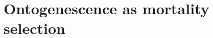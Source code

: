 \documentclass[12pt, parskip=half]{scrartcl}
\begin{document}

\section{Ontogenescence as mortality selection}

\end{document}
